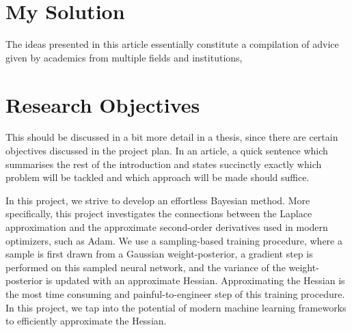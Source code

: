 \section{My Solution}

The ideas presented in this article essentially constitute a compilation of advice given by academics from multiple fields and institutions,


\section{Research Objectives}


This should be discussed in a bit more detail in a thesis, since there
are certain objectives discussed in the project plan.
In an article, a quick sentence which summarises the rest of the
introduction and states succinctly exactly which problem will be tackled
and which approach will be made should suffice.

In this project, we strive to develop an effortless Bayesian method.
More specifically, this project investigates the connections between the
Laplace approximation and the approximate second-order derivatives used
in modern optimizers, such as Adam. We use a sampling-based training
procedure, where a sample is first drawn from a Gaussian
weight-posterior, a gradient step is performed on this sampled neural
network, and the variance of the weight-posterior is updated with an
approximate Hessian. Approximating the Hessian is the most time
consuming and painful-to-engineer step of this training procedure. In
this project, we tap into the potential of modern machine learning
frameworks to efficiently approximate the Hessian.
